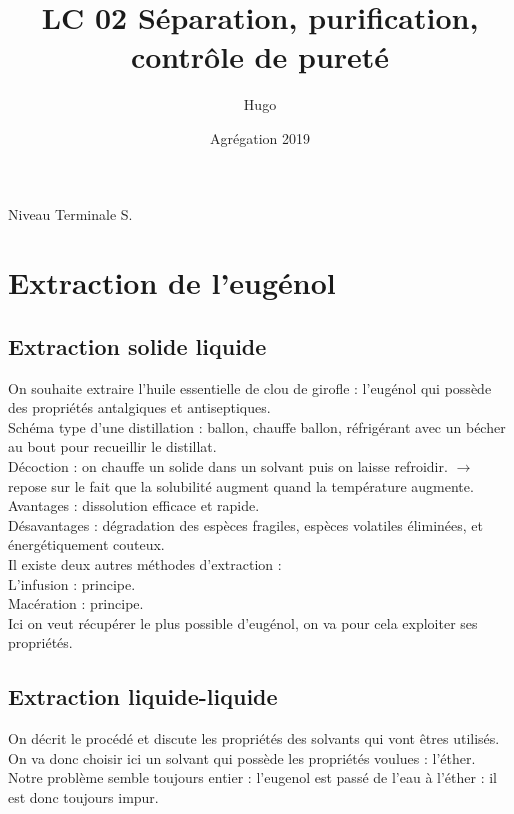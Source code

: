 \documentclass[12pt,prb,aps,epsf]{article}
\begin{document}
	
	\title{LC 02 Séparation, purification, contrôle de pureté}
		\author{Hugo}
		\date{Agrégation 2019}
		
	\maketitle
	
	\tableofcontents
	
	\pagebreak
	
Niveau Terminale S.

\section{Extraction de l'eugénol}
\subsection{Extraction solide liquide}
On souhaite extraire l'huile essentielle de clou de girofle : l'eugénol qui possède des propriétés antalgiques et antiseptiques.\\
Schéma type d'une distillation : ballon, chauffe ballon, réfrigérant avec un bécher au bout pour recueillir le distillat.\\
Décoction : on chauffe un solide dans un solvant puis on laisse refroidir. $\rightarrow$ repose sur le fait que la solubilité augment quand la température augmente.\\
Avantages : dissolution efficace et rapide.\\
Désavantages : dégradation des espèces fragiles, espèces volatiles éliminées, et énergétiquement couteux.\\


Il existe deux autres méthodes d'extraction :\\
L'infusion : principe.\\
Macération : principe.\\

Ici on veut récupérer le plus possible d'eugénol, on va pour cela exploiter ses propriétés.

\subsection{Extraction liquide-liquide}
On décrit le procédé et discute les propriétés des solvants qui vont êtres utilisés. On va donc choisir ici un solvant qui possède les propriétés voulues : l'éther.\\
Notre problème semble toujours entier : l'eugenol est passé de l'eau à l'éther : il est donc toujours impur.
\end{document}
